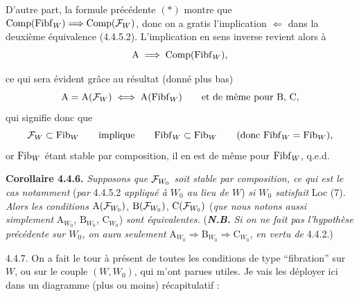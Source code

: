 D'autre part, la formule précédente $(*)$ montre que $\mathrm{Comp}(\mathrm{Fibf}_W) \Longrightarrow \mathrm{Comp}(\mathcal{F}_W)$, donc on a gratis l'implication $\Longleftarrow$ dans la deuxième équivalence (4.4.5.2). L'implication en sens inverse revient alors à
\[
\mathrm{A} \;\Longrightarrow\; \mathrm{Comp}(\mathrm{Fibf}_W),
\]


ce qui sera évident grâce au résultat (donné plus bas)
\[
\mathrm{A} = \mathrm{A}(\mathcal{F}_W) \iff \mathrm{A}(\mathrm{Fibf}_W) \qquad \text{et de même pour B, C,}
\]
qui signifie donc que
\[
\mathcal{F}_W \subset \mathrm{Fib}_W \qquad \text{implique} \qquad \mathrm{Fibf}_W \subset \mathrm{Fib}_W \qquad (\text{donc } \mathrm{Fibf}_W = \mathrm{Fib}_W),
\]
or $\mathrm{Fib}_W$ étant stable par composition, il en est de même pour $\mathrm{Fibf}_W$, q.e.d.

\textbf{Corollaire 4.4.6.} \textit{Supposons que $\mathcal{F}_{W_0}$ soit stable par composition, ce qui est le cas notamment} (\textit{par} 4.4.5.2 \textit{appliqué à $W_0$ au lieu de $W$}) \textit{si $W_0$ satisfait} Loc (7). \textit{Alors les conditions} $\mathrm{A}(\mathcal{F}_{W_0})$, $\mathrm{B}(\mathcal{F}_{W_0})$, $\mathrm{C}(\mathcal{F}_{W_0})$ (\textit{que nous notons aussi simplement} $\mathrm{A}_{W_0}$, $\mathrm{B}_{W_0}$, $\mathrm{C}_{W_0}$) \textit{sont équivalentes.} (\textbf{\textit{N.B.}} \textit{Si on ne fait pas l'hypothèse précédente sur $W_0$, on aura seulement} $\mathrm{A}_{W_0} \Longrightarrow \mathrm{B}_{W_0} \Longrightarrow \mathrm{C}_{W_0}$, \textit{en vertu de} 4.4.2.)

4.4.7. On a fait le tour à présent de toutes les conditions de type “fibration” sur $W$, ou sur le couple $(W, W_0)$, qui m'ont parues utiles. Je vais les déployer ici dans un diagramme (plus ou moins) récapitulatif : %


